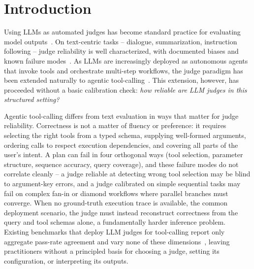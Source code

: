\vspace{-0.2cm}
\section{Introduction}
\vspace{-0.1cm}
Using LLMs as automated judges has become standard practice for evaluating model outputs~\citep{zheng2023judging,tan2025judgebench,li2024arenahard}. On text-centric tasks -- dialogue, summarization, instruction following -- judge reliability is well characterized, with documented biases and known failure modes~\citep{zheng2023judging,wang2023fair}. As LLMs are increasingly deployed as autonomous agents that invoke tools and orchestrate multi-step workflows, the judge paradigm has been extended naturally to agentic tool-calling~\citep{qin2024toolllm,guo2024stabletoolbench,guo2025mcpagentbench}. This extension, however, has proceeded without a basic calibration check: \emph{how reliable are LLM judges in this structured setting?}

Agentic tool-calling differs from text evaluation in ways that matter for judge reliability. Correctness is not a matter of fluency or preference: it requires selecting the right tools from a typed schema, supplying well-formed arguments, ordering calls to respect execution dependencies, and covering all parts of the user's intent. A plan can fail in four orthogonal ways (tool selection, parameter structure, sequence accuracy, query coverage), and these failure modes do not correlate cleanly -- a judge reliable at detecting wrong tool selection may be blind to argument-key errors, and a judge calibrated on simple sequential tasks may fail on complex fan-in or diamond workflows where parallel branches must converge. When no ground-truth execution trace is available, the common deployment scenario, the judge must instead reconstruct correctness from the query and tool schemas alone, a fundamentally harder inference problem. Existing benchmarks that deploy LLM judges for tool-calling report only aggregate pass-rate agreement and vary none of these dimensions~\citep{qin2024toolllm,guo2024stabletoolbench,guo2025mcpagentbench}, leaving practitioners without a principled basis for choosing a judge, setting its configuration, or interpreting its outputs.

